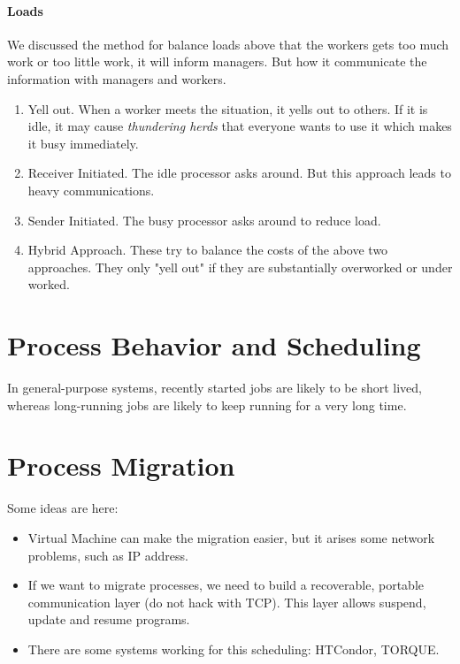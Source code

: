 \paragraph{Loads}
We discussed the method for balance loads above that the workers gets too much work or too little work, it will inform managers. But how it communicate the information with managers and workers.

\begin{enumerate}
    \item Yell out. When a worker meets the situation, it yells out to others. If it is idle, it may cause \emph{thundering herds} that everyone wants to use it which makes it busy immediately.
    \item Receiver Initiated. The idle processor asks around. But this approach leads to heavy communications.
    \item Sender Initiated. The busy processor asks around to reduce load.
    \item Hybrid Approach. These try to balance the costs of the above two approaches. They only "yell out" if they are substantially overworked or under worked.
\end{enumerate}

\section{Process Behavior and Scheduling}
In general-purpose systems, recently started jobs are likely to be short lived, whereas long-running jobs are likely to keep running for a very long time.

\section{Process Migration}
Some ideas are here:
\begin{itemize}
    \item Virtual Machine can make the migration easier, but it arises some network problems, such as IP address.
    \item If we want to migrate processes, we need to build a recoverable, portable communication layer (do not hack with TCP). This layer allows suspend, update and resume programs.
    \item There are some systems working for this scheduling: HTCondor, TORQUE.
\end{itemize}